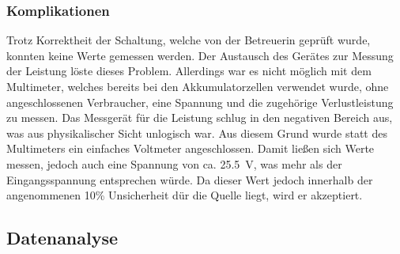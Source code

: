 \subsubsection{Komplikationen}

Trotz Korrektheit der Schaltung, welche von der Betreuerin geprüft wurde, konnten keine Werte gemessen werden. 
Der Austausch des Gerätes zur Messung der Leistung löste dieses Problem.
Allerdings war es nicht möglich mit dem Multimeter, welches bereits bei den Akkumulatorzellen verwendet wurde, ohne angeschlossenen Verbraucher, eine Spannung und die zugehörige Verlustleistung zu messen.
Das Messgerät für die Leistung schlug in den negativen Bereich aus, was aus physikalischer Sicht unlogisch war.
Aus diesem Grund wurde statt des Multimeters ein einfaches Voltmeter angeschlossen.
Damit ließen sich Werte messen, jedoch auch eine Spannung von ca. \SI{25,5}{\V}, was mehr als der Eingangsspannung entsprechen würde. Da dieser Wert jedoch innerhalb der angenommenen 10\% Unsicherheit dür die Quelle liegt, wird er akzeptiert.

\subsection{Datenanalyse}


